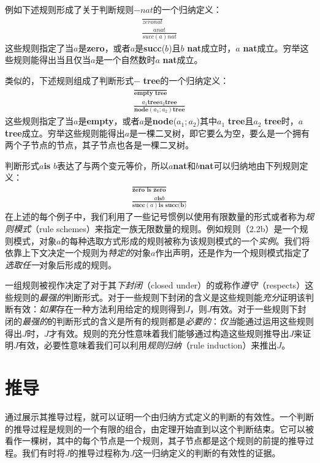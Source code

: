 例如下述规则形成了关于判断规则$- nat$的一个归纳定义：
\begin{align*}
\frac{}{zero nat} \\
\frac{a nat}{succ(a) nat}
\end{align*}
这些规则指定了当$a$是\textbf{zero}，或者$a$是\textbf{succ}($b$)且$b$ \textbf{nat}成立时，$a$ \textbf{nat}成立。穷举这些规则能得出当且仅当$a$是一个自然数时$a$ \textbf{nat}成立。

类似的，下述规则组成了判断形式$-$ \textbf{tree}的一个归纳定义：
\begin{align*}
\frac{}{\textbf{empty tree}} \\
\frac{a_{1} \textbf{tree}   a_{2} \textbf{tree}}{\textbf{node}(a_{1};a_{2})\textbf{tree}}
\end{align*}
这些规则指定了当$a$是\textbf{empty}，或者$a$是\textbf{node}($a_{1};a_{2}$)其中$a_{1}$ \textbf{tree}且$a_{2}$ \textbf{tree}时，$a$ \textbf{tree}成立。穷举这些规则能得出$a$是一棵二叉树，即它要么为空，要么是一个拥有两个子节点的节点，其子节点也各是一棵二叉树。

判断形式$a$\quad\textbf{is} $b$表达了与两个变元等价，所以$a$\quad\textbf{nat}和$b$\quad\textbf{nat}可以归纳地由下列规则定义：
\begin{align*}
\frac{}{\textbf{zero is zero}} \\
\frac{a \textbf{is} b}{\textbf{succ}(a)\textbf{is succ(b)}}
\end{align*}
在上述的每个例子中，我们利用了一些记号惯例以使用有限数量的形式或者称为\textit{规则模式}（rule schemes）来指定一族无限数量的规则。例如规则（2.2b）是一个规则模式，对象$a$的每种选取方式形成的规则被称为该规则模式的一个\textit{实例}。我们将依靠上下文决定一个规则为\textit{特定的}对象$a$作出声明，还是作为一个规则模式指定了\textit{选取任一}对象后形成的规则。

一组规则被视作决定了对于其\textit{下封闭}（closed under）的或称作\textit{遵守}（respects）这些规则的\textit{最强的}判断形式。对于一些规则下封闭的含义是这些规则能\textit{充分}证明该判断有效：\textit{如果}存在一种方法利用给定的规则得到$J$，则$J$有效。对于一些规则下封闭的\textit{最强的}的判断形式的含义是所有的规则都是\textit{必要的}：\textit{仅当}能通过运用这些规则得出$J$时，$J$才有效。规则的充分性意味着我们能够通过构造这些规则推导出$J$来证明$J$有效，必要性意味着我们可以利用\textit{规则归纳}（rule induction）来推出$J$。
\section{推导}
通过展示其推导过程，就可以证明一个由归纳方式定义的判断的有效性。一个判断的推导过程是规则的一个有限的组合，由定理开始直到以这个判断结束。它可以被看作一棵树，其中的每个节点是一个规则，其子节点都是这个规则的前提的推导过程。我们有时将$J$的推导过程称为$J$这一归纳定义的判断的有效性的证据。

